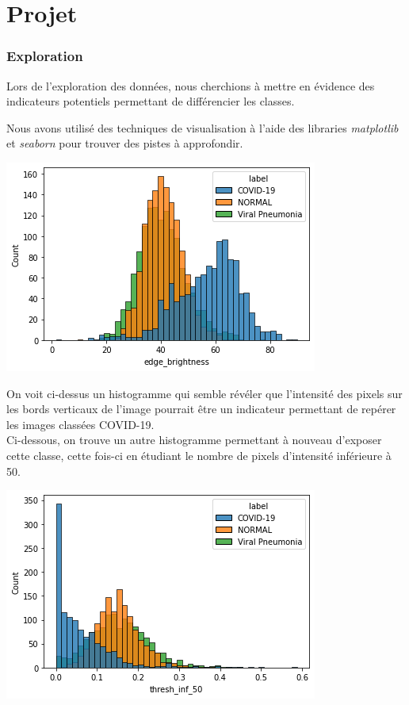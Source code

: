 \documentclass{article}
\begin{document}
	\section*{Projet}
	
	\subsubsection*{Exploration}
	
	\par Lors de l'exploration des données, nous cherchions à mettre en évidence des indicateurs potentiels permettant de différencier les classes.
	
	\par Nous avons utilisé des techniques de visualisation à l'aide des libraries \textit{matplotlib} et \textit{seaborn} pour trouver des pistes à approfondir.
	
	\includegraphics[scale=0.6]{edge_intensity.png}
	
	\par On voit ci-dessus un histogramme qui semble révéler que l'intensité des pixels sur les bords verticaux de l'image pourrait être un indicateur permettant de repérer les images classées COVID-19.\\
	Ci-dessous, on trouve un autre histogramme permettant à nouveau d'exposer cette classe, cette fois-ci en étudiant le nombre de pixels d'intensité inférieure à 50.
	
	\includegraphics[scale=0.6]{intensity_thresh.png}
		
\end{document}
